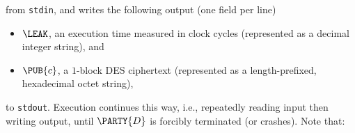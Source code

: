 \noindent
from \lstinline[language={bash}]{stdin},
and 
writes the following output (one field per line)

\begin{itemize}
\item $\LEAK$,
      an execution time measured in clock cycles
      (represented as a                       decimal integer string),
      and
\item $\PUB{c}$,
      a  ${1}$-block DES ciphertext
      (represented as a  length-prefixed, hexadecimal octet   string), 
\end{itemize}

\noindent
to   \lstinline[language={bash}]{stdout}.
Execution continues this way, i.e., repeatedly reading input then writing 
output, until $\PARTY{D}$ is forcibly terminated (or crashes).
Note that:


